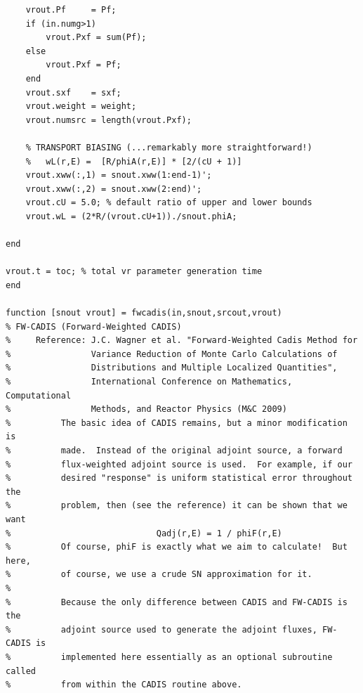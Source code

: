 \documentclass[letter,11pt]{article}
\begin{document}
{\begin{verbatim}
    vrout.Pf     = Pf;
    if (in.numg>1)
        vrout.Pxf = sum(Pf);
    else
        vrout.Pxf = Pf;
    end
    vrout.sxf    = sxf;
    vrout.weight = weight;
    vrout.numsrc = length(vrout.Pxf);
    
    % TRANSPORT BIASING (...remarkably more straightforward!)
    %   wL(r,E) =  [R/phiA(r,E)] * [2/(cU + 1)]
    vrout.xww(:,1) = snout.xww(1:end-1)';
    vrout.xww(:,2) = snout.xww(2:end)';
    vrout.cU = 5.0; % default ratio of upper and lower bounds
    vrout.wL = (2*R/(vrout.cU+1))./snout.phiA;
    
end

vrout.t = toc; % total vr parameter generation time
end

function [snout vrout] = fwcadis(in,snout,srcout,vrout)
% FW-CADIS (Forward-Weighted CADIS)
%     Reference: J.C. Wagner et al. "Forward-Weighted Cadis Method for
%                Variance Reduction of Monte Carlo Calculations of 
%                Distributions and Multiple Localized Quantities",
%                International Conference on Mathematics, Computational
%                Methods, and Reactor Physics (M&C 2009)
%          The basic idea of CADIS remains, but a minor modification is
%          made.  Instead of the original adjoint source, a forward
%          flux-weighted adjoint source is used.  For example, if our
%          desired "response" is uniform statistical error throughout the
%          problem, then (see the reference) it can be shown that we want
%                             Qadj(r,E) = 1 / phiF(r,E)
%          Of course, phiF is exactly what we aim to calculate!  But here, 
%          of course, we use a crude SN approximation for it.
%
%          Because the only difference between CADIS and FW-CADIS is the 
%          adjoint source used to generate the adjoint fluxes, FW-CADIS is
%          implemented here essentially as an optional subroutine called
%          from within the CADIS routine above.
    

\end{verbatim}}
\end{document}
